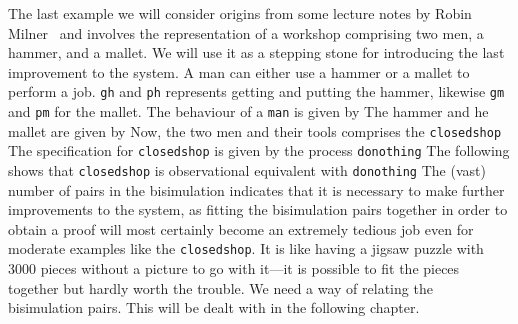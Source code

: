The last example we will consider origins from some lecture notes by Robin Milner~\cite{Larsen} and involves the representation of a workshop comprising two men, a hammer, and a mallet. We will use it as a stepping stone for introducing the last improvement to the system. A man can either use a hammer or a mallet to perform a job. \verb#gh# and \verb#ph# represents getting and putting the hammer, likewise \verb#gm# and \verb#pm# for the mallet. The behaviour of a \verb#man# is given by
%
The hammer and he mallet are given by
%
Now, the two men and their tools comprises the \verb#closedshop#
%
The specification for \verb#closedshop# is given by the process \verb#donothing#
%
The following shows that \verb#closedshop# is observational equivalent with \verb#donothing#
%
The (vast) number of pairs in the bisimulation indicates that it is necessary to make further improvements to the system, as fitting the bisimulation pairs together in order to obtain a proof will most certainly become an extremely tedious job even for moderate examples like the \verb#closedshop#. It is like having a jigsaw puzzle with 3000 pieces without a picture to go with it---it is possible to fit the pieces together but hardly worth the trouble. We need a way of relating the bisimulation pairs. This will be dealt with in the following chapter.



